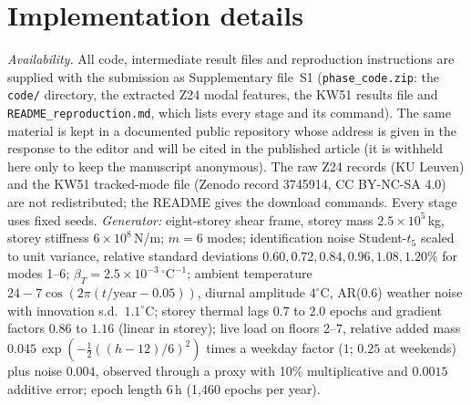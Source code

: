 \documentclass[12pt,a4paper]{article}
\newcommand{\rev}[1]{#1}
\newenvironment{revblock}{}{}
\newcommand{\rev}[1]{{\color{revcol}#1}}
\newenvironment{revblock}{\begingroup\color{revcol}}{\endgroup}
\newcommand{\rtwo}[1]{#1}
\newcommand{\rtwo}[1]{{\color{revcolb}#1}}
\begin{document}
\begin{revblock}
\section{Implementation details}\label{app:impl}

\begin{singlespace}
\small
\noindent \color{revcolb}\rev{\emph{Availability.} All code, intermediate result files and reproduction instructions are supplied with the submission as Supplementary file~S1 (\texttt{phase\_code.zip}: the \texttt{code/} directory, the extracted Z24 modal features, the KW51 results file and \texttt{README\_reproduction.md}, which lists every stage and its command).\color{revcol} \rtwo{The same material is kept in a documented public repository whose address is given in the response to the editor and will be cited in the published article (it is withheld here only to keep the manuscript anonymous).} \color{revcolb}The raw Z24 records (KU Leuven) and the KW51 tracked-mode file (Zenodo record 3745914, CC BY-NC-SA 4.0) are not redistributed; the README gives the download commands.} Every stage uses fixed seeds.\color{revcol} \emph{Generator:} eight-storey shear frame, storey mass $2.5\times10^5$\,kg, storey stiffness $6\times10^8$\,N/m; $m=6$ modes; identification noise Student-$t_5$ scaled to unit variance, relative standard deviations $0.60,0.72,0.84,0.96,1.08,1.20\%$ for modes 1--6; $\beta_T=2.5\times10^{-3}\,^\circ\mathrm{C}^{-1}$; ambient temperature $24-7\cos(2\pi(t/\text{year}-0.05))$, diurnal amplitude $4^\circ$C, AR(0.6) weather noise with innovation s.d.\ $1.1^\circ$C; storey thermal lags $0.7$ to $2.0$ epochs and gradient factors $0.86$ to $1.16$ (linear in storey); live load on floors 2--7, relative added mass $0.045\,\exp(-\tfrac12((h-12)/6)^2)$ times a weekday factor ($1$; $0.25$ at weekends) plus noise $0.004$, observed through a proxy with 10\% multiplicative and $0.0015$ additive error; epoch length 6\,h (1{,}460 epochs per year).


\end{singlespace}
\end{revblock}
\end{document}
